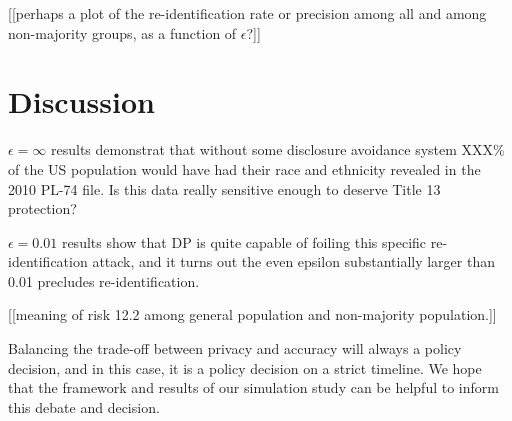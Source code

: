 \documentclass{article}
\begin{document}
[[perhaps a plot of the re-identification rate or precision among all and among non-majority groups, as a function of $\epsilon$?]]


\section{Discussion}

$\epsilon=\infty$ results demonstrat that without some disclosure avoidance system XXX\% of the US population would have had their race and ethnicity revealed in the 2010 PL-74 file.  Is this data really sensitive enough to deserve Title 13 protection?

$\epsilon=0.01$ results show that DP is quite capable of foiling this specific re-identification attack, and it turns out the even epsilon substantially larger than 0.01 precludes re-identification.

[[meaning of risk 12.2 among general population and non-majority population.]]

Balancing the trade-off between privacy and accuracy will always a policy decision, and in this case, it 
is a policy decision on a strict timeline.  We hope that the framework and results of our simulation study can be helpful to inform this debate and decision.





\end{document}
